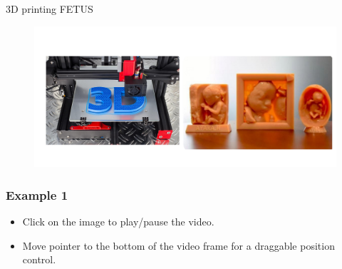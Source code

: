 {
\begin{frame}{3D printing FETUS}
      \begin{figure}
        \centering
        \includegraphics[width=1.0\textwidth]{./figures/3d-printing/versions/drawing-v00.png}
      \end{figure}
\end{frame}
}

{
\begin{frame}
  \frametitle{Example 1}
  \vspace{10pt}
  \begin{center}
  \end{center}

  \begin{itemize}
    \item Click on the image to play/pause the video.
    \item Move pointer to the bottom of the video frame for a draggable position
      control.
  \end{itemize}
\end{frame}
}
